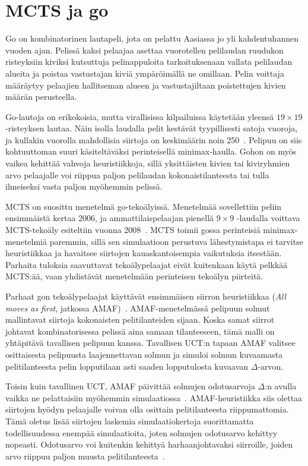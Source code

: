 \documentclass[12pt,finnish]{tktltiki2}
\theoremstyle{definition}
\theoremstyle{remark}
\begin{document}
\section{MCTS ja go}

Go on kombinatorinen lautapeli, jota on pelattu Aasiassa jo yli kahdentuhannen vuoden ajan. Pelissä kaksi pelaajaa asettaa vuorotellen pelilaudan ruudukon risteyksiin kiviksi kutsuttuja pelinappuloita tarkoituksenaan vallata pelilaudan alueita ja poistaa vastustajan kiviä ympäröimällä ne omillaan. Pelin voittaja määräytyy pelaajien hallitseman alueen ja vastustajiltaan poistettujen kivien määrän perusteella.

Go-lautoja on erikokoisia, mutta virallisissa kilpailuissa käytetään yleensä $19 \times 19$ -risteyksen lautaa. Näin isolla laudalla pelit kestävät tyypillisesti satoja vuoroja, ja kullakin vuorolla mahdollisia siirtoja on keskimäärin noin 250~\cite{browne}. Pelipuu on siis kohtuuttoman suuri käsiteltäväksi perinteisellä minimax-haulla. Gohon on myös vaikea kehittää vahvoja heuristiikkoja, sillä yksittäisten kivien tai kiviryhmien arvo pelaajalle voi riippua paljon pelilaudan kokonaistilanteesta tai tulla ilmeiseksi vasta paljon myöhemmin pelissä.

MCTS on suosittu menetelmä go-tekoälyissä. Menetelmää sovellettiin peliin ensimmäistä kertaa 2006, ja ammattilaispelaajan pienellä $9 \times 9$ -laudalla voittava MCTS-tekoäly esiteltiin vuonna 2008~\cite{browne}. MCTS toimii gossa perinteisiä minimax-menetelmiä paremmin, sillä sen simulaatioon perustuva lähestymistapa ei tarvitse heuristiikkaa ja havaitsee siirtojen kauaskantoisempia vaikutuksia itsestään. Parhaita tuloksia saavuttavat tekoälypelaajat eivät kuitenkaan käytä pelkkää MCTS:ää, vaan yhdistävät menetelmään perinteisen tekoälyn piirteitä.

Parhaat gon tekoälypelaajat käyttävät ensimmäisen siirron heuristiikkaa (\textit{All moves as first}, jatkossa AMAF)~\cite{browne}. AMAF-menetelmässä pelipuun solmut mallintavat siirtoja kokonaisten pelitilanteiden sijaan. Koska samat siirrot johtavat kombinatorisessa pelissä aina samaan tilanteeseen, tämä malli on yhtäpitävä tavallisen pelipuun kanssa. Tavallisen UCT:n tapaan AMAF valitsee osittaisesta pelipuusta laajennettavan solmun ja simuloi solmun kuvaamasta pelitilanteesta pelin lopputilaan asti saaden lopputulosta kuvaavan $\Delta$-arvon.

Toisin kuin tavallinen UCT, AMAF päivittää solmujen odotusarvoja $\Delta$:n avulla vaikka ne pelattaisiin myöhemmin simulaatiossa~\cite{browne, helmbold}. AMAF-heuristiikka siis olettaa siirtojen hyödyn pelaajalle voivan olla osittain pelitilanteesta riippumattomia. Tämä oletus lisää siirtojen laskemia simulaatiokertoja suorittamatta todellisuudessa enempää simulaatioita, joten solmujen odotusarvo kehittyy nopeasti. Odotusarvo voi kuitenkin kehittyä harhaanjohtavaksi siirroille, joiden arvo riippuu paljon muusta pelitilanteesta~\cite{helmbold}.
\end{document}
